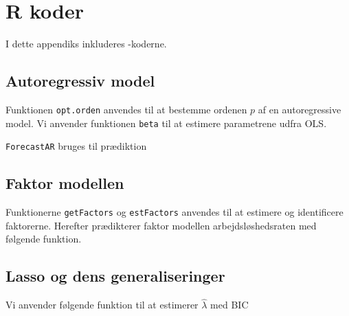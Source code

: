 \chapter{R koder} \label{app:r_koder}
I dette appendiks inkluderes \Rlang-koderne. 

\section{Autoregressiv model} \label{sec:auto}
Funktionen \texttt{opt.orden} anvendes til at bestemme ordenen $p$ af en autoregressive model.  
%
Vi anvender funktionen \texttt{beta} til at estimere parametrene udfra OLS. 

\texttt{ForecastAR} bruges til prædiktion

\section{Faktor modellen} \label{sec:faktor}
Funktionerne \texttt{getFactors} og \texttt{estFactors} anvendes til at estimere og identificere faktorerne. 
%
%
Herefter prædikterer faktor modellen arbejdsløshedsraten med følgende funktion.


\section{Lasso og dens generaliseringer} \label{sec:lasso}


Vi anvender følgende funktion til at estimerer $\widehat{\lambda}$ med BIC

